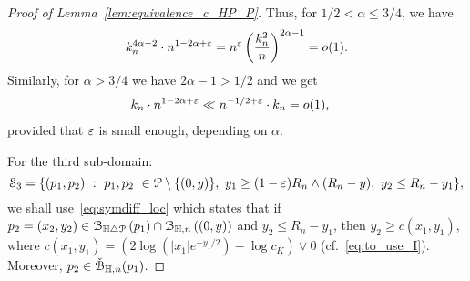 \begin{proof}[Proof of Lemma~\ref{lem:equivalence_c_HP_P}]
Thus, for $1/2 < \alpha \leq3/4$, we have 
\begin{equation} \label{eq:2nd_term-1st_regime}
\begin{split}
k_n^{4 \alpha -2} \cdot  n^{1-2\alpha + \varepsilon} 
= n^{\varepsilon} \left( \frac{k_n^2}{n}\right)^{2\alpha -1} = o(1).
\end{split}
\end{equation}
Similarly, for $\alpha > 3/4$ we have $2\alpha -1 > 1/2$ and we get
\begin{equation} \label{eq:2nd_term-2nd_regime}
\begin{split}
&k_n \cdot n^{1-2\alpha + \varepsilon} 
\ll n^{-1/2 + \varepsilon}  \cdot k_n  = o(1),
\end{split}
\end{equation}
provided that $\varepsilon$ is small enough, depending on $\alpha$. 

For the third sub-domain:
$$\mathcal{S}_3 = \{(p_1, p_2) \ : \  p_1,p_2 \ \in {\mathcal P} \setminus \{(0,y) \}, \ y_1 \geq (1-\varepsilon) R_n \wedge (R_n-y), \ y_2 \leq R_n -y_1 \}, $$
we shall use~\eqref{eq:symdiff_loc} which states that if 
$p_2=(x_2,y_2) \in {\mathcal B}_{\mathbb{H} \bigtriangleup {\mathcal P}}\left(p_1\right)\cap {\mathcal B}_{\mathbb{H},n}\left((0,y)\right)$ and $y_2\leq R_n - y_1$, then 
$y_2 \geq c(x_1,y_1)$, where $c(x_1,y_1) = \left(2 \log(|x_1|e^{-y_1/2}) - \log c_K \right) \vee 0$ (cf.~\eqref{eq:to_use_I}). Moreover, $p_2 \in \check{{\mathcal B}}_{\mathbb{H},n}(p_1)$.



\end{proof}

